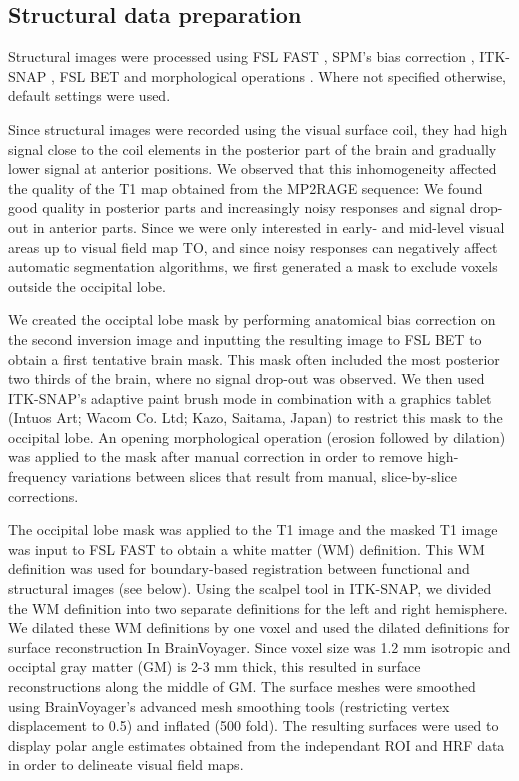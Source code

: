 \subsection{Structural data preparation}
Structural images were processed using FSL FAST \parencite{Zhang2001}, SPM's bias correction \parencite{Ashburner2005}, ITK-SNAP \parencite{py06nimg}, FSL BET \parencite{Smith2002} and morphological operations \parencite{scipy2001}. Where not specified otherwise, default settings were used. 

Since structural images were recorded using the visual surface coil, they had high signal close to the coil elements in the posterior part of the brain and gradually lower signal at anterior positions. We observed that this inhomogeneity affected the quality of the T1 map obtained from the MP2RAGE sequence: We found good quality in posterior parts and increasingly noisy responses and signal drop-out in anterior parts. Since we were only interested in early- and mid-level visual areas up to visual field map TO, and since noisy responses can negatively affect automatic segmentation algorithms, we first generated a mask to exclude voxels outside the occipital lobe.

We created the occiptal lobe mask by performing anatomical bias correction on the second inversion image and inputting the resulting image to FSL BET to obtain a first tentative brain mask. This mask often included the most posterior two thirds of the brain, where no signal drop-out was observed. We then used ITK-SNAP's adaptive paint brush mode in combination with a graphics tablet (Intuos Art; Wacom Co. Ltd; Kazo, Saitama, Japan) to restrict this mask to the occipital lobe. An opening morphological operation (erosion followed by dilation) was applied to the mask after manual correction in order to remove high-frequency variations between slices that result from manual, slice-by-slice corrections.

The occipital lobe mask was applied to the T1 image and the masked T1 image was input to FSL FAST to obtain a white matter (WM) definition. This WM definition was used for boundary-based registration between functional and structural images (see below). Using the scalpel tool in ITK-SNAP, we divided the WM definition into two separate definitions for the left and right hemisphere. We dilated these WM definitions by one voxel and used the dilated definitions for surface reconstruction In BrainVoyager. Since voxel size was 1.2 mm isotropic and occiptal gray matter (GM) is 2-3 mm thick, this resulted in surface reconstructions along the middle of GM. The surface meshes were smoothed using BrainVoyager's advanced mesh smoothing tools (restricting vertex displacement to 0.5) and inflated (500 fold). The resulting surfaces were used to display polar angle estimates obtained from the independant ROI and HRF data in order to delineate visual field maps.

